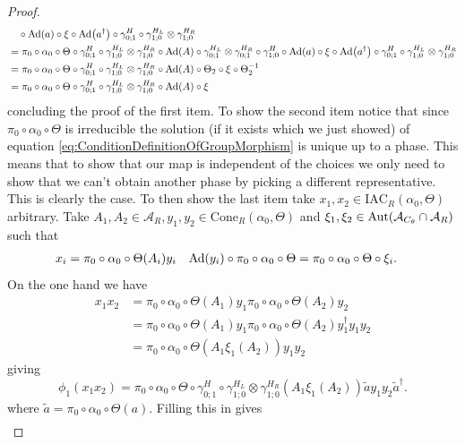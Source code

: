 \documentclass[12pt,a4paper,twoside]{article}
\let\originalleft\left
\let\originalright\right
\renewcommand{\left}{\mathopen{}\mathclose\bgroup\originalleft}
\renewcommand{\right}{\aftergroup\egroup\originalright}
\renewcommand{\AA}{\mathcal A}
\newcommand{\Ad}[1]{\textrm{Ad}\left(#1\right)}
\newcommand{\Aut}[1]{\textrm{Aut}\left(#1\right)}
\theoremstyle{definition}
\numberwithin{equation}{section}
\begin{document}
\begin{proof}
\begin{align}
		\nonumber
		&\quad\circ\Ad{a}\circ\xi\circ\Ad{a^\dagger}\circ\gamma^H_{0;1}\circ\gamma^{H_L}_{1;0}\otimes\gamma^{H_R}_{1;0}\\
		&=\pi_0\circ\alpha_0\circ\Theta\circ\gamma^H_{0;1}\circ\gamma^{H_L}_{1;0}\otimes\gamma^{H_R}_{1;0}\circ\Ad{A}\circ\gamma^{H_L}_{0;1}\otimes\gamma^{H_R}_{0;1}\circ\gamma^H_{1;0}\circ\Ad{a}\circ\xi\circ\Ad{a^\dagger}\circ\gamma^H_{0;1}\circ\gamma^{H_L}_{1;0}\otimes\gamma^{H_R}_{1;0}\\
		&=\pi_0\circ\alpha_0\circ\Theta\circ\gamma^H_{0;1}\circ\gamma^{H_L}_{1;0}\otimes\gamma^{H_R}_{1;0}\circ\Ad{A}\circ\Theta_2\circ\xi\circ\Theta_2^{-1}\\
		&=\pi_0\circ\alpha_0\circ\Theta\circ\gamma^H_{0;1}\circ\gamma^{H_L}_{1;0}\otimes\gamma^{H_R}_{1;0}\circ\Ad{A}\circ\xi
	\end{align}
	concluding the proof of the first item. To show the second item notice that since $\pi_0\circ\alpha_0\circ\Theta$ is irreducible the solution (if it exists which we just showed) of equation \eqref{eq:ConditionDefinitionOfGroupMorphism} is unique up to a phase. This means that to show that our map is independent of the choices we only need to show that we can't obtain another phase by picking a different representative. This is clearly the case. To then show the last item take $x_1,x_2\in \textrm{IAC}_R(\alpha_0,\Theta)$ arbitrary. Take $A_1,A_2\in\AA_R,y_1,y_2\in \textrm{Cone}_R(\alpha_0,\Theta)$ and $\xi_1,\xi_2\in\Aut{\AA_{C_\theta}\cap\AA_R}$ such that
	\begin{align}
		x_i&=\pi_0\circ\alpha_0\circ\Theta(A_i)y_i&\Ad{y_i}\circ\pi_0\circ\alpha_0\circ\Theta&=\pi_0\circ\alpha_0\circ\Theta\circ\xi_i.
	\end{align}
	On the one hand we have
	\begin{align}
		x_1x_2&=\pi_0\circ\alpha_0\circ\Theta(A_1)y_1\pi_0\circ\alpha_0\circ\Theta(A_2)y_2\\
		&=\pi_0\circ\alpha_0\circ\Theta(A_1)y_1\pi_0\circ\alpha_0\circ\Theta(A_2)y_1^{\dagger}y_1y_2\\
		&=\pi_0\circ\alpha_0\circ\Theta(A_1\xi_1(A_2))y_1y_2
	\end{align}
	giving
	\begin{equation}
		\phi_1(x_1x_2)=\pi_0\circ\alpha_0\circ\Theta\circ\gamma^H_{0;1}\circ\gamma^{H_L}_{1;0}\otimes\gamma^{H_R}_{1;0}(A_1\xi_1(A_2))\tilde{a}y_1y_2\tilde{a}^\dagger.
	\end{equation}
	where $\tilde{a}=\pi_0\circ\alpha_0\circ\Theta(a)$. Filling this in gives
	\begin{align}

\end{align}
\end{proof}
\end{document}
